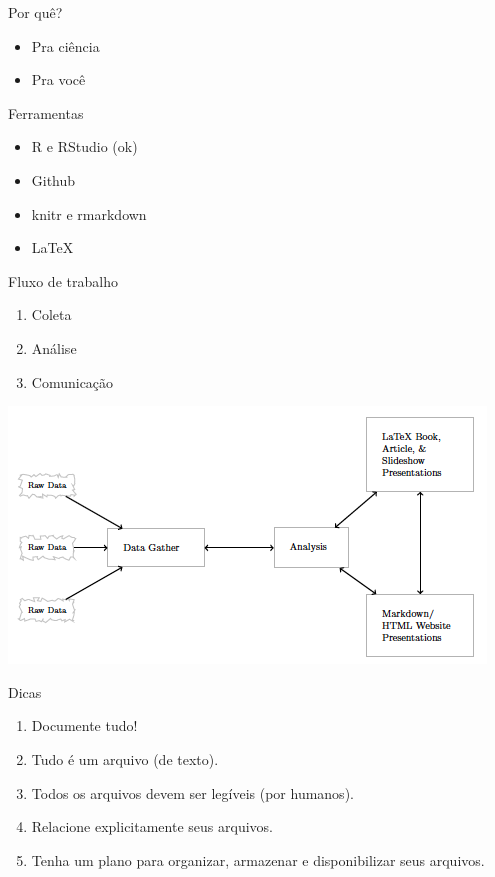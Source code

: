 \documentclass[
  9pt,
  ignorenonframetext,
]{beamer}
\begin{document}
\begin{frame}{Por quê?}
\protect\hypertarget{por-quuxea}{}
\begin{itemize}
\item
  Pra ciência
\item
  Pra você
\end{itemize}
\end{frame}

\begin{frame}{Ferramentas}
\protect\hypertarget{ferramentas}{}
\begin{itemize}
\item
  R e RStudio (ok)
\item
  Github
\item
  knitr e rmarkdown
\item
  LaTeX
\end{itemize}
\end{frame}

\begin{frame}{Fluxo de trabalho}
\protect\hypertarget{fluxo-de-trabalho}{}
\begin{enumerate}
\item
  Coleta
\item
  Análise
\item
  Comunicação
\end{enumerate}
\end{frame}

\begin{frame}{}
\protect\hypertarget{section-11}{}
\begin{center}\includegraphics[width=1\linewidth]{imgs/fluxo_gandrud} \end{center}
\end{frame}

\begin{frame}{Dicas}
\protect\hypertarget{dicas}{}
\begin{enumerate}
\item
  Documente tudo!
\item
  Tudo é um arquivo (de texto).
\item
  Todos os arquivos devem ser legíveis (por humanos).
\item
  Relacione explicitamente seus arquivos.
\item
  Tenha um plano para organizar, armazenar e disponibilizar seus
  arquivos.
\end{enumerate}
\end{frame}
\end{document}

